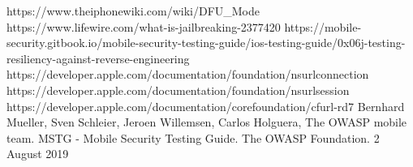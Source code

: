 \documentclass[runningheads]{llncs}
\begin{document}


\newpage
\hfill

%



%
%
%
% 
% 
%

\begin{thebibliography}{8}

 https://www.theiphonewiki.com/wiki/DFU\_Mode
 https://www.lifewire.com/what-is-jailbreaking-2377420
 https://mobile-security.gitbook.io/mobile-security-testing-guide/ios-testing-guide/0x06j-testing-resiliency-against-reverse-engineering
 https://developer.apple.com/documentation/foundation/nsurlconnection
 https://developer.apple.com/documentation/foundation/nsurlsession
 https://developer.apple.com/documentation/corefoundation/cfurl-rd7
 Bernhard Mueller, Sven Schleier, Jeroen Willemsen, Carlos Holguera, The OWASP mobile team. MSTG - Mobile Security Testing Guide. The OWASP Foundation. 2 August 2019
\end{thebibliography}
\end{document}

